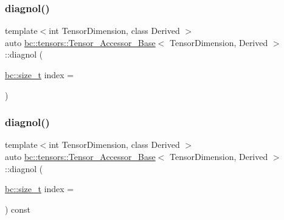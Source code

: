 \subsubsection{\texorpdfstring{diagnol()}{diagnol()}\hspace{0.1cm}{\footnotesize\ttfamily [1/2]}}
{\footnotesize\ttfamily template$<$int Tensor\+Dimension, class Derived $>$ \\
auto \hyperlink{classbc_1_1tensors_1_1Tensor__Accessor__Base}{bc\+::tensors\+::\+Tensor\+\_\+\+Accessor\+\_\+\+Base}$<$ Tensor\+Dimension, Derived $>$\+::diagnol (\begin{DoxyParamCaption}\item[{\hyperlink{namespacebc_aaf8e3fbf99b04b1b57c4f80c6f55d3c5}{bc\+::size\+\_\+t}}]{index = {} }\end{DoxyParamCaption})\hspace{0.3cm}{\ttfamily [inline]}}

\mbox{\label{classbc_1_1tensors_1_1Tensor__Accessor__Base_acbe85b2ef3eadd07ecad796a3bff6c2c}} 
\subsubsection{\texorpdfstring{diagnol()}{diagnol()}\hspace{0.1cm}{\footnotesize\ttfamily [2/2]}}
{\footnotesize\ttfamily template$<$int Tensor\+Dimension, class Derived $>$ \\
auto \hyperlink{classbc_1_1tensors_1_1Tensor__Accessor__Base}{bc\+::tensors\+::\+Tensor\+\_\+\+Accessor\+\_\+\+Base}$<$ Tensor\+Dimension, Derived $>$\+::diagnol (\begin{DoxyParamCaption}\item[{\hyperlink{namespacebc_aaf8e3fbf99b04b1b57c4f80c6f55d3c5}{bc\+::size\+\_\+t}}]{index = {} }\end{DoxyParamCaption}) const\hspace{0.3cm}{\ttfamily [inline]}}

\mbox{\label{classbc_1_1tensors_1_1Tensor__Accessor__Base_ac3d8f935af512bc05fbe7382c89bdea8}} 
